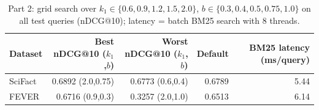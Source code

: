 \begin{table}[ht]\centering\small
\begin{tabular}{lrrrr}\toprule
Dataset & Best nDCG@10 ($k_1$,$b$) & Worst nDCG@10 ($k_1$,$b$) & Default & BM25 latency (ms/query) \\ \midrule
SciFact & 0.6892 (2.0,0.75) & 0.6773 (0.6,0.4) & 0.6789 & 5.44 \\
FEVER & 0.6716 (0.9,0.3) & 0.3257 (2.0,1.0) & 0.6513 & 6.14 \\
\bottomrule\end{tabular}
\caption{Part 2: grid search over $k_1\in\{0.6,0.9,1.2,1.5,2.0\}$, $b\in\{0.3,0.4,0.5,0.75,1.0\}$ on all test queries (nDCG@10); latency = batch BM25 search with 8 threads.}\label{tab:grid}\end{table}
